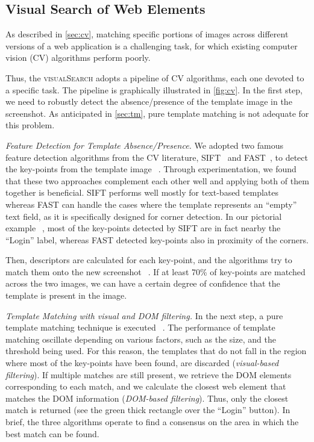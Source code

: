 \subsection{Visual Search of Web Elements}

As described in \autoref{sec:cv}, matching specific portions of images across different versions of a web application is a challenging task, for which existing computer vision (CV) algorithms perform poorly. 

Thus, the \textsc{visualSearch} adopts a pipeline of CV algorithms, each one devoted to a specific task. The pipeline is graphically illustrated in \autoref{fig:cv}. In the first step, we need to robustly detect the absence/presence of the template image in the screenshot. As anticipated in \autoref{sec:tm}, pure template matching is not adequate for this problem. 

\textit{Feature Detection for Template Absence/Presence.}
We adopted two famous feature detection algorithms from the CV literature, SIFT~\cite{Lowe1999,Lowe2004} and FAST~\cite{rosten2005tracking,rosten2008faster}, to detect the key-points from the template image~\textcircled{}. Through experimentation, we found that these two approaches complement each other well and applying both of them together is beneficial. SIFT performs well mostly for text-based templates whereas FAST can handle the cases where the template represents an ``empty'' text field, as it is specifically designed for corner detection. In our pictorial example~\textcircled{}, most of the key-points detected by SIFT are in fact nearby the ``Login'' label, whereas FAST detected key-points also in proximity of the corners.
 
Then, descriptors are calculated for each key-point, and the algorithms try to match them onto the new screenshot~\textcircled{}.
If at least 70\% of key-points are matched across the two images, we can have a certain degree of confidence that the template is present in the image. 

\textit{Template Matching with visual and DOM filtering.}
In the next step, a pure template matching technique is executed~\textcircled{}. The performance of template matching oscillate depending on various factors, such as the size, and the threshold being used. For this reason, the templates that do not fall in the region where most of the key-points have been found, are discarded (\textit{visual-based filtering}). If multiple matches are still present, we retrieve the DOM elements corresponding to each match, and we calculate the closest web element that matches the DOM information (\textit{DOM-based filtering}).
Thus, only the closest match is returned (see the green thick rectangle over the ``Login'' button). In brief, the three algorithms operate to find a consensus on the area in which the best match can be found. 

